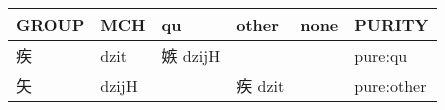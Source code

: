\documentclass[14pt,a4paper]{scrartcl}
\begin{document}
\begin{longtable}[c]{@{}llllll@{}}
\toprule
\begin{minipage}[b]{0.14\columnwidth}\raggedright\strut
GROUP
\strut\end{minipage} &
\begin{minipage}[b]{0.14\columnwidth}\raggedright\strut
MCH
\strut\end{minipage} &
\begin{minipage}[b]{0.14\columnwidth}\raggedright\strut
qu
\strut\end{minipage} &
\begin{minipage}[b]{0.14\columnwidth}\raggedright\strut
other
\strut\end{minipage} &
\begin{minipage}[b]{0.14\columnwidth}\raggedright\strut
none
\strut\end{minipage} &
\begin{minipage}[b]{0.14\columnwidth}\raggedright\strut
PURITY
\strut\end{minipage}\tabularnewline
\midrule
\endhead
\begin{minipage}[t]{0.14\columnwidth}\raggedright\strut
疾
\strut\end{minipage} &
\begin{minipage}[t]{0.14\columnwidth}\raggedright\strut
dzit
\strut\end{minipage} &
\begin{minipage}[t]{0.14\columnwidth}\raggedright\strut
嫉 dzijH
\strut\end{minipage} &
\begin{minipage}[t]{0.14\columnwidth}\raggedright\strut
\strut\end{minipage} &
\begin{minipage}[t]{0.14\columnwidth}\raggedright\strut
\strut\end{minipage} &
\begin{minipage}[t]{0.14\columnwidth}\raggedright\strut
pure:qu
\strut\end{minipage}\tabularnewline
\begin{minipage}[t]{0.14\columnwidth}\raggedright\strut
矢
\strut\end{minipage} &
\begin{minipage}[t]{0.14\columnwidth}\raggedright\strut
dzijH
\strut\end{minipage} &
\begin{minipage}[t]{0.14\columnwidth}\raggedright\strut
\strut\end{minipage} &
\begin{minipage}[t]{0.14\columnwidth}\raggedright\strut
疾 dzit
\strut\end{minipage} &
\begin{minipage}[t]{0.14\columnwidth}\raggedright\strut
\strut\end{minipage} &
\begin{minipage}[t]{0.14\columnwidth}\raggedright\strut
pure:other
\strut\end{minipage}\tabularnewline
\bottomrule
\end{longtable}
\end{document}

